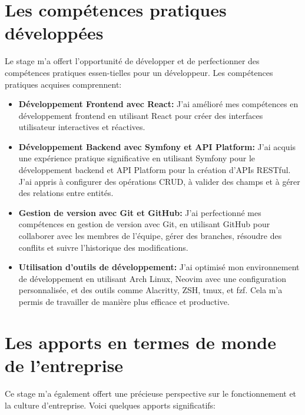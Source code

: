 \section{Les compétences pratiques développées}

\hspace{16pt}Le stage m’a offert l’opportunité de développer et de perfectionner des compétences pratiques essen-tielles pour un développeur. Les compétences pratiques acquises comprennent:

\begin{itemize}
  \item \textbf{Développement Frontend avec React: } J’ai amélioré mes compétences en développement frontend en utilisant React pour créer des interfaces utilisateur interactives et réactives.
  \item \textbf{Développement Backend avec Symfony et API Platform: }J’ai acquis une expérience pratique significative en utilisant Symfony pour le développement backend et API Platform pour la création d’APIs RESTful. J’ai appris à configurer des opérations CRUD, à valider des champs et à gérer des relations entre entités.
  \item \textbf{Gestion de version avec Git et GitHub: }J’ai perfectionné mes compétences en gestion de version avec Git, en utilisant GitHub pour collaborer avec les membres de l’équipe, gérer des branches, résoudre des conflits et suivre l’historique des modifications.
  \item \textbf{Utilisation d’outils de développement: }J’ai optimisé mon environnement de développement en utilisant Arch Linux, Neovim avec une configuration personnalisée, et des outils comme Alacritty, ZSH, tmux, et fzf. Cela m’a permis de travailler de manière plus efficace et productive.
\end{itemize}

\section{Les apports en termes de monde de l'entreprise}

\hspace{16pt}Ce stage m’a également offert une précieuse perspective sur le fonctionnement et la culture d’entreprise. Voici quelques apports significatifs:


